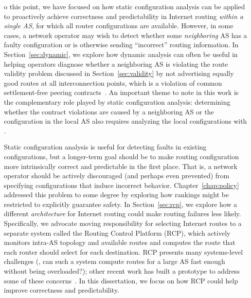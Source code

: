 o this point, we have focused on how static configuration analysis
can be applied to proactively achieve correctness and predictability in
Internet routing {\em within a single AS}, for which all router
configurations are available.  However, in some cases, a network
operator may wish to detect whether some {\em neighboring} AS has a
faulty configuration or is otherwise sending ``incorrect'' routing
information.  In Section~\ref{sec:dynamic}, we explore how dynamic
analysis can often be useful in helping operators diagnose whether a
neighboring AS is violating the route validity problem discussed in
Section~\ref{sec:validity} by not advertising equally good routes at all
interconnection points, which is a violation of common settlement-free
peering contracts~\cite{www-aol}.  An important theme to note in this
work is the complementary role played by static configuration analysis:
determining whether the contract violations are caused by a neighboring
AS or the configuration in the local AS also requires analyzing the
local configurations with \rccns.  

Static configuration analysis is useful for detecting faults in existing
configurations, but a longer-term goal should be to make routing
configuration more intrinsically correct and predictable in the first
place.  That is, a network operator should be actively discouraged (and
perhaps even prevented) from specifying configurations that induce
incorrect behavior.  Chapter~\ref{chap:policy} addressed this problem to
some degree by exploring how rankings might be restricted to explicitly
guarantee safety.  In Section~\ref{sec:rcp}, we explore how a different
{\em architecture} for Internet routing could make routing failures less
likely.  Specifically, we advocate moving responsibility for selecting
Internet routes to a separate system called the Routing Control Platform
(RCP), which actively monitors intra-AS topology and available routes
and computes the route that each router should select for each
destination.  RCP presents many systems-level challenges (\eg, can such
a system compute routes for a large AS fast enough without being
overloaded?); other recent work has built a prototype to address some of
these concerns~\cite{caesar2004}.  In this dissertation, we focus on how
RCP could help improve correctness and predictability.
